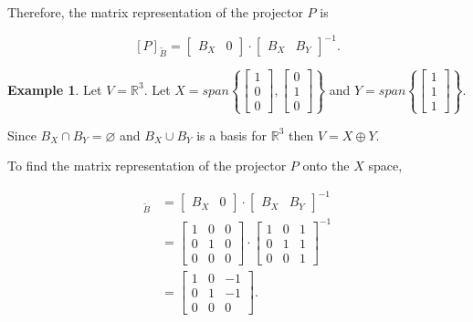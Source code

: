 \documentclass[12pt]{article}
\theoremstyle{definition}
\newtheorem*{example}{Example}
\begin{document}
Therefore, the matrix representation of the projector $P$ is

\[ [P]_{\tilde{B}} = \begin{bmatrix} B_X & 0 \end{bmatrix} \cdot \begin{bmatrix} B_X & B_Y 
\end{bmatrix}^{-1}. \]

\begin{example}
Let $V = \mathbb{R}^3$. Let $X = span \left\{ \begin{bmatrix} 1 \\ 0 \\ 0 \end{bmatrix},
\begin{bmatrix} 0 \\ 1 \\ 0 \end{bmatrix} \right\}$ and
$Y = span \left\{ \begin{bmatrix} 1 \\ 1 \\ 1 \end{bmatrix} \right\}$.

Since $B_X \cap B_Y = \varnothing$ and $B_X \cup B_Y$ is a basis for $\mathbb{R}^3$ then
$V = X \oplus Y$.

To find the matrix representation of the projector $P$ onto the $X$ space,

\begin{align*}
[P]_{\tilde{B}} &= \begin{bmatrix} B_X & 0 \end{bmatrix} \cdot 
\begin{bmatrix} B_X & B_Y \end{bmatrix}^{-1} \\
&=
\begin{bmatrix}
1 & 0 & 0 \\
0 & 1 & 0 \\
0 & 0 & 0 
\end{bmatrix}
\cdot
\begin{bmatrix}
1 & 0 & 1 \\
0 & 1 & 1 \\
0 & 0 & 1
\end{bmatrix}^{-1} \\
&= 
\begin{bmatrix}
1 & 0 & -1 \\
0 & 1 & -1 \\
0 & 0 & 0
\end{bmatrix}.
\end{align*}
\end{example}
\end{document}
